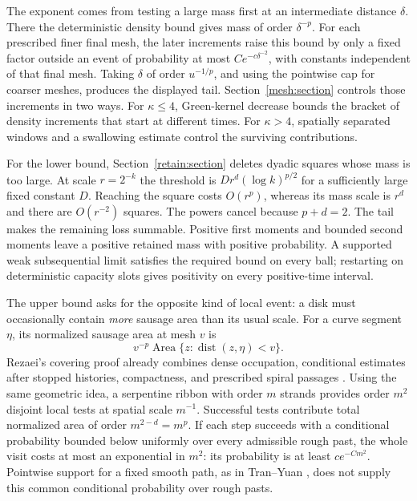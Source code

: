 \documentclass[11pt]{article}
\theoremstyle{definition}
\theoremstyle{remark}
\numberwithin{equation}{section}
\begin{document}
The exponent comes from testing a large mass first at an intermediate
distance $\delta$. There the deterministic density bound gives mass
of order $\delta^{-p}$. For each prescribed finer final mesh, the
later increments raise this bound by only a fixed factor outside an
event of probability at most $Ce^{-c\delta^{-2}}$, with constants
independent of that final mesh. Taking $\delta$ of order $u^{-1/p}$,
and using the pointwise cap for coarser meshes, produces the displayed
tail. Section~\ref{mesh:section} controls those increments
in two ways. For $\kappa\le4$, Green-kernel decrease bounds the bracket
of density increments that start at different times. For $\kappa>4$,
spatially separated windows and a swallowing estimate control the
surviving contributions.

For the lower bound, Section~\ref{retain:section} deletes dyadic
squares whose mass is too large. At scale $r=2^{-k}$ the threshold is
$Dr^d(\log k)^{p/2}$ for a sufficiently large fixed constant $D$.
Reaching the square costs $O(r^p)$, whereas
its mass scale is $r^d$ and there are $O(r^{-2})$ squares.
The powers cancel because $p+d=2$. The tail makes the remaining
loss summable. Positive first moments and bounded second moments
leave a positive retained mass with positive probability. A supported
weak subsequential limit satisfies the required bound on every ball;
restarting on deterministic capacity slots gives positivity on every
positive-time interval.

The upper bound asks for the opposite kind of local event: a disk
must occasionally contain \emph{more} sausage area than its usual
scale. For a curve segment $\eta$, its normalized sausage area at
mesh $v$ is
\[
 v^{-p}\operatorname{Area}\{z:\operatorname{dist}(z,\eta)<v\}.
\]
Rezaei's covering proof already combines dense occupation, conditional
estimates after stopped histories, compactness, and prescribed spiral
passages \cite[Section~3, Lemmas~3.1--3.3]{rezaei2018}. Using the same
geometric idea, a serpentine ribbon with order $m$ strands provides order $m^2$
disjoint local tests at spatial scale $m^{-1}$. Successful tests
contribute total normalized area of order $m^{2-d}=m^p$. If each
step succeeds with a conditional probability bounded below uniformly
over every admissible rough past, the whole visit costs at most an
exponential in $m^2$: its probability is at least $ce^{-Cm^2}$.
Pointwise support for a fixed smooth path, as in Tran--Yuan
\cite[Theorem~1.1, Corollary~1.2, and Proposition~1.4]{tranyuan2020},
does not supply this common conditional probability over rough pasts.
\end{document}
